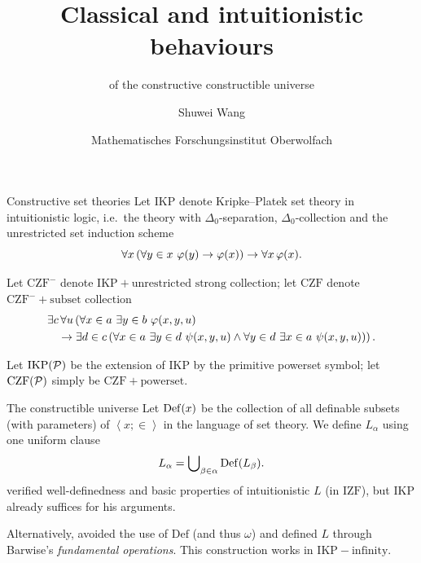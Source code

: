 \documentclass{beamer}
\title[The constructive constructible universe]{\LARGE Classical and intuitionistic behaviours}
\subtitle{\texorpdfstring{\vspace{-0.6em}}{}\upshape of the constructive constructible universe}
\author{Shuwei Wang}
\institute{\upshape University of Warsaw}
\date{Mathematisches Forschungsinstitut Oberwolfach\\\DTMdate{2026-11-18}\vspace{0.4em}}
\newcommand\tuple[1]{\left\langle #1 \right\rangle}
\begin{document}
\begin{frame}
  \titlepage
\end{frame}

\begin{frame}{Constructive set theories}
  Let $\mathrm{IKP}$ denote Kripke--Platek set theory in intuitionistic logic, i.e.\ the theory with $\Delta_0$-separation, $\Delta_0$-collection and the unrestricted set induction scheme
  \[\forall x \left(\forall y \in x \ \varphi\mleft(y\mright) \rightarrow \varphi\mleft(x\mright)\right) \rightarrow \forall x \, \varphi\mleft(x\mright).\]

  \vspace{0.6em}

  Let $\mathrm{CZF}^-$ denote $\mathrm{IKP} + \text{unrestricted strong collection}$; let $\mathrm{CZF}$ denote $\mathrm{CZF}^- + \text{subset collection}$
  \begin{align*}
     & \exists c \, \forall u \left(\forall x \in a \ \exists y \in b \ \varphi\mleft(x, y, u\mright)\right.                                                                                             \\
     & \ \ \left.{} \rightarrow \exists d \in c \left(\forall x \in a \ \exists y \in d \ \psi\mleft(x, y, u\mright) \land \forall y \in d \ \exists x \in a \ \psi\mleft(x, y, u\mright)\right)\right).
  \end{align*}

  \vspace{0.6em}

  Let $\mathrm{IKP}\mleft(\mathcal{P}\mright)$ be the extension of $\mathrm{IKP}$ by the primitive powerset symbol; let $\mathrm{CZF}\mleft(\mathcal{P}\mright)$ simply be $\mathrm{CZF} + \text{powerset}$.
\end{frame}

\begin{frame}{The constructible universe}
  Let $\mathrm{Def}\mleft(x\mright)$ be the collection of all definable subsets (with parameters) of $\tuple{x; \in}$ in the language of set theory. We define $L_\alpha$ using one uniform clause
  \[L_\alpha = \bigcup\nolimits_{\beta \in \alpha} \mathrm{Def}\mleft(L_\beta\mright).\]
   verified well-definedness and basic properties of intuitionistic $L$ (in $\mathrm{IZF}$), but $\mathrm{IKP}$ already suffices for his arguments.

  \vspace{1em}

  Alternatively,  avoided the use of $\mathrm{Def}$ (and thus $\omega$) and defined $L$ through Barwise's \emph{fundamental operations}. This construction works in $\mathrm{IKP} - \text{infinity}$.
\end{frame}
\end{document}
